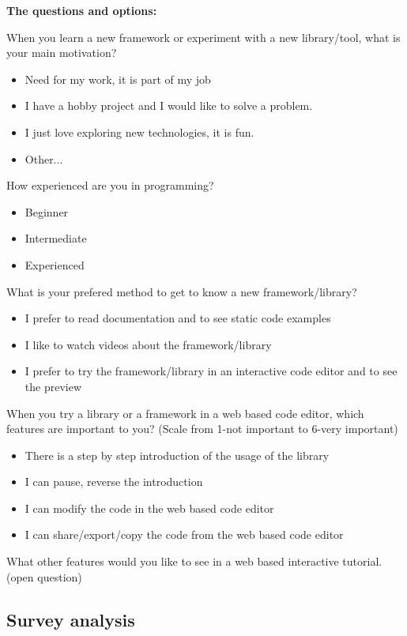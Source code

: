 \documentclass[11pt, a4paper, oneside, openright, medskipamount]{report}
\begin{document}
\textbf{The questions and options:}

\noindent When you learn a new framework or experiment with a new library/tool, what is your main motivation?
\begin{itemize}[noitemsep]
\item Need for my work, it is part of my job
\item I have a hobby project and I would like to solve a problem.
\item I just love exploring new technologies, it is fun.
\item Other...
\end{itemize}

\noindent How experienced are you in programming?
\begin{itemize}[noitemsep]
\item Beginner
\item Intermediate
\item Experienced
\end{itemize}

\noindent What is your prefered method to get to know a new framework/library?
\begin{itemize}[noitemsep]
\item I prefer to read documentation and to see static code examples
\item I like to watch videos about the framework/library
\item I prefer to try the framework/library in an interactive code editor and to see the preview
\end{itemize}

\noindent When you try a library or a framework in a web based code editor, which features are important to you? (Scale from 1-not important to 6-very important)
\begin{itemize}[noitemsep]
\item There is a step by step introduction of the usage of the library
\item I can pause, reverse the introduction
\item I can modify the code in the web based code editor
\item I can share/export/copy the code from the web based code editor
\end{itemize}

What other features would you like to see in a web based interactive tutorial.
(open question)

\subsection{Survey analysis}
\end{document}
